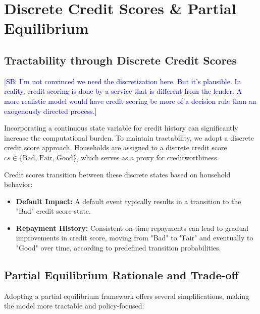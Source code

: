 \documentclass[acmsmall]{acmart}
\newcommand{\spb}[1]{\textcolor{blue}{[SB: #1]}}
\begin{document}
\section*{Discrete Credit Scores \& Partial Equilibrium}

\subsection{Tractability through Discrete Credit Scores}

\spb{I'm not convinced we need the discretization here. But it's plausible. In reality, credit scoring is done by a service that is different from the lender. A more realistic model would have credit scoring be more of a decision rule than an exogenously directed process.}

Incorporating a continuous state variable for credit history can significantly increase the computational burden. To maintain tractability, we adopt a discrete credit score approach. Households are assigned to a discrete credit score $cs \in \{\text{Bad, Fair, Good}\}$, which serves as a proxy for creditworthiness.

Credit scores transition between these discrete states based on household behavior:
\begin{itemize}
    \item \textbf{Default Impact:} A default event typically results in a transition to the "Bad" credit score state.
    \item \textbf{Repayment History:} Consistent on-time repayments can lead to gradual improvements in credit score, moving from "Bad" to "Fair" and eventually to "Good" over time, according to predefined transition probabilities.
\end{itemize}

\subsection{Partial Equilibrium Rationale and Trade-off}

Adopting a partial equilibrium framework offers several simplifications, making the model more tractable and policy-focused:
\end{document}
